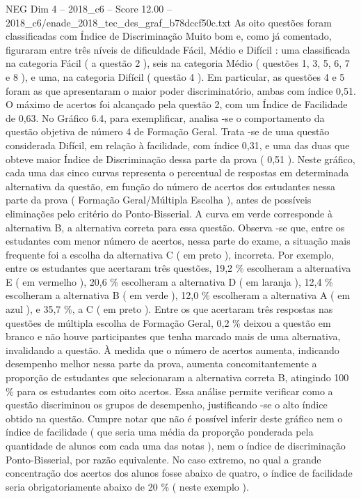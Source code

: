 \begin{textsample}{NEG Dim 4 – 2018\_c6 – Score 12.00 – 2018\_c6/enade\_2018\_tec\_des\_graf\_b78dccf50c.txt}
As oito questões foram classificadas com Índice de Discriminação Muito bom e, como já comentado, figuraram entre três níveis de dificuldade Fácil, Médio e Difícil : uma classificada na categoria Fácil ( a questão 2 ), seis na categoria Médio ( questões 1, 3, 5, 6, 7 e 8 ), e uma, na categoria Difícil ( questão 4 ).
Em particular, as questões 4 e 5 foram as que apresentaram o maior poder discriminatório, ambas com índice 0,51.
O máximo de acertos foi alcançado pela questão 2, com um Índice de Facilidade de 0,63.
No Gráfico 6.4, para exemplificar, analisa -se o comportamento da questão objetiva de número 4 de Formação Geral.
Trata -se de uma questão considerada Difícil, em relação à facilidade, com índice 0,31, e uma das duas que obteve maior Índice de Discriminação dessa parte da prova ( 0,51 ).
Neste gráfico, cada uma das cinco curvas representa o percentual de respostas em determinada alternativa da questão, em função do número de acertos dos estudantes nessa parte da prova ( Formação Geral/Múltipla Escolha ), antes de possíveis eliminações pelo critério do Ponto-Bisserial.
A curva em verde corresponde à alternativa B, a alternativa correta para essa questão.
Observa -se que, entre os estudantes com menor número de acertos, nessa parte do exame, a situação mais frequente foi a escolha da alternativa C ( em preto ), incorreta.
Por exemplo, entre os estudantes que acertaram três questões, 19,2 \% escolheram a alternativa E ( em vermelho ), 20,6 \% escolheram a alternativa D ( em laranja ), 12,4 \% escolheram a alternativa B ( em verde ), 12,0 \% escolheram a alternativa A ( em azul ), e 35,7 \%, a C ( em preto ).
Entre os que acertaram três respostas nas questões de múltipla escolha de Formação Geral, 0,2 \% deixou a questão em branco e não houve participantes que tenha marcado mais de uma alternativa, invalidando a questão.
À medida que o número de acertos aumenta, indicando desempenho melhor nessa parte da prova, aumenta concomitantemente a proporção de estudantes que selecionaram a alternativa correta B, atingindo 100 \% para os estudantes com oito acertos.
Essa análise permite verificar como a questão discriminou os grupos de desempenho, justificando -se o alto índice obtido na questão.
Cumpre notar que não é possível inferir deste gráfico nem o índice de facilidade ( que seria uma média da proporção ponderada pela quantidade de alunos com cada uma das notas ), nem o índice de discriminação Ponto-Bisserial, por razão equivalente.
No caso extremo, no qual a grande concentração dos acertos dos alunos fosse abaixo de quatro, o índice de facilidade seria obrigatoriamente abaixo de 20 \% ( neste exemplo ).

\end{textsample}
